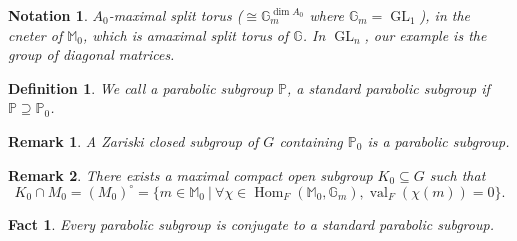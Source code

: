 \documentclass[8pt]{article}
\newtheorem{definition}{Definition}[section]
\newtheorem{notation}{Notation}[section]
\newtheorem{remark}{Remark}[section]
\newtheorem{fact}{Fact}[section]
\DeclareMathOperator{\GL}{GL}
\DeclareMathOperator{\Hom}{Hom}
\DeclareMathOperator{\val}{val}
\newcommand{\G}[0]{\mathbb{G}}
\newcommand{\Para}[0]{\mathbb{P}}
\newcommand{\M}[0]{\mathbb{M}}
\newcommand{\sep}[0]{\:|\:}
\begin{document}
\begin{notation}
  $A_0$-maximal split torus ($\cong \G_m^{\dim A_0}$ where $\G_m = \GL_1$), in the cneter of $\M_0$, which is amaximal split torus of $\G$. In $\GL_n$, our example is the group of diagonal matrices.
\end{notation}

\begin{definition}
  We call a parabolic subgroup $\Para$, a standard parabolic subgroup if $\Para\supseteq\Para_0$.
\end{definition}

\begin{remark}
  A Zariski closed subgroup of $G$ containing $\Para_0$ is a parabolic subgroup.
\end{remark}

\begin{remark}
  \label{remark_maximal_compact_open_subgroup}
  There exists a maximal compact open subgroup $K_0\subseteq G$ such that 
    \begin{equation*}
    K_0\cap M_0 = (M_0)^\circ = \{m\in\M_0\sep\forall \chi\in\Hom_F(\M_0,\G_m), \val_F(\chi(m)) = 0\}.
    \end{equation*}
\end{remark}

\begin{fact}
  \label{fact_46}
  Every parabolic subgroup is conjugate to a standard parabolic subgroup.
\end{fact}
\end{document}
